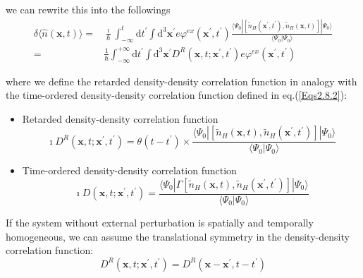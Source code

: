 we can rewrite this into the followings
\begin{equation} \label{Eqs3.1.12} \begin{split}
\delta \langle \hat{n}(\mathbf{x},t) \rangle =& \frac{\imath}{\hbar} \int_{-\infty}^{t}\mathrm{d} t^{'} \int \mathrm{d}^3 \mathbf{x}^{'} e \varphi^{ex}(\mathbf{x}^{'},t^{'}) \frac{\langle \Psi_0 | \left[ \tilde{n}_{H}(\mathbf{x}^{'},t^{'}), \tilde{n}_H(\mathbf{x},t) \right] | \Psi_0 \rangle}{\langle \Psi_0 | \Psi_0 \rangle}\\
=& \frac{1}{\hbar} \int_{-\infty}^{+\infty} \mathrm{d}t^{'} \int \mathrm{d}^3 \mathbf{x}^{'} D^R(\mathbf{x},t;\mathbf{x}^{'},t^{'}) e \varphi^{ex}(\mathbf{x}^{'},t^{'})
\end{split}\end{equation}

where we define the retarded density-density correlation function in analogy with the time-ordered density-density correlation function defined in eq.(\ref{Eqs2.8.2}):

\begin{itemize}
\item Retarded density-density correlation function
\begin{equation*} \label{Eqs3.1.12'} \tag{3.1.12'}
\imath D^R(\mathbf{x},t;\mathbf{x}^{'},t^{'}) = \theta(t-t^{'}) \times \frac{\langle \Psi_0 | [\tilde{n}_H(\mathbf{x},t), \tilde{n}_H(\mathbf{x}^{'},t^{'})] | \Psi_0 \rangle}{\langle \Psi_0 | \Psi_0 \rangle}
\end{equation*}

\item Time-ordered density-density correlation function
\begin{equation*} \label{Eqs2.8.2'} \tag{2.8.2'}
\imath D(\mathbf{x},t;\mathbf{x}^{'},t^{'}) = \frac{\langle \Psi_0 | \Gamma[\tilde{n}_H(\mathbf{x},t), \tilde{n}_H(\mathbf{x}^{'},t^{'})] | \Psi_0 \rangle}{\langle \Psi_0 | \Psi_0 \rangle}
\end{equation*}
\end{itemize}

If the system without external perturbation is spatially and temporally homogeneous, we can assume the translational symmetry in the density-density correlation function:
\begin{equation} \label{Eqs3.1.13}
D^R(\mathbf{x},t;\mathbf{x}^{'},t^{'}) = D^R(\mathbf{x}-\mathbf{x}^{'},t-t^{'})
\end{equation}

